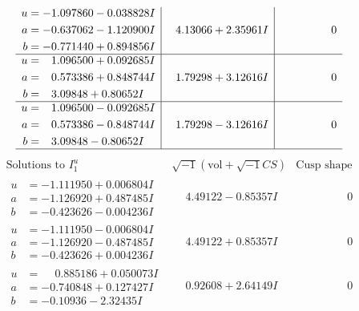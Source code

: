 \documentclass[1p]{elsarticle_modified}
\theoremstyle{definition}
\newcommand{\I}{\sqrt{-1}}
\begin{document}
$$\begin{array}{c|c|c}
\begin{aligned}
u &= -1.097860 - 0.038828 I \\
a &= -0.637062 - 1.120900 I \\
b &= -0.771440 + 0.894856 I\end{aligned}
 & \phantom{-}4.13066 + 2.35961 I & \phantom{-0.000000 } 0 \\ \hline\begin{aligned}
u &= \phantom{-}1.096500 + 0.092685 I \\
a &= \phantom{-}0.573386 + 0.848744 I \\
b &= \phantom{-}3.09848 + 0.80652 I\end{aligned}
 & \phantom{-}1.79298 + 3.12616 I & \phantom{-0.000000 } 0 \\ \hline\begin{aligned}
u &= \phantom{-}1.096500 - 0.092685 I \\
a &= \phantom{-}0.573386 - 0.848744 I \\
b &= \phantom{-}3.09848 - 0.80652 I\end{aligned}
 & \phantom{-}1.79298 - 3.12616 I & \phantom{-0.000000 } 0\\
 \hline 
 \end{array}$$\newpage$$\begin{array}{c|c|c}  
\text{Solutions to }I^u_{1}& \I (\text{vol} + \sqrt{-1}CS) & \text{Cusp shape}\\
 \hline 
\begin{aligned}
u &= -1.111950 + 0.006804 I \\
a &= -1.126920 + 0.487485 I \\
b &= -0.423626 - 0.004236 I\end{aligned}
 & \phantom{-}4.49122 - 0.85357 I & \phantom{-0.000000 } 0 \\ \hline\begin{aligned}
u &= -1.111950 - 0.006804 I \\
a &= -1.126920 - 0.487485 I \\
b &= -0.423626 + 0.004236 I\end{aligned}
 & \phantom{-}4.49122 + 0.85357 I & \phantom{-0.000000 } 0 \\ \hline\begin{aligned}
u &= \phantom{-}0.885186 + 0.050073 I \\
a &= -0.740848 + 0.127427 I \\
b &= -0.10936 - 2.32435 I\end{aligned}
 & \phantom{-}0.92608 + 2.64149 I & \phantom{-0.000000 } 0 \\ \hline\begin{aligned}

\end{aligned}
\end{array}$$
\end{document}
